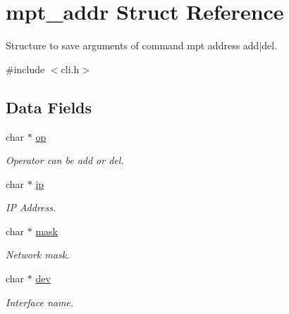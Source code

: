 \hypertarget{structmpt__addr}{\section{mpt\-\_\-addr Struct Reference}
\label{structmpt__addr}
}


Structure to save arguments of command mpt address add$|$del.  




{\ttfamily \#include $<$cli.\-h$>$}

\subsection*{Data Fields}
\begin{DoxyCompactItemize}
\item 
\hypertarget{structmpt__addr_a15206368e0a18f984f0ad6cb10c2995e}{char $\ast$ \hyperlink{structmpt__addr_a15206368e0a18f984f0ad6cb10c2995e}{op}}\label{structmpt__addr_a15206368e0a18f984f0ad6cb10c2995e}

\begin{DoxyCompactList}\small\item\em Operator can be add or del. \end{DoxyCompactList}\item 
\hypertarget{structmpt__addr_afbc356cd0e25d1dbbece7c10fd025fa6}{char $\ast$ \hyperlink{structmpt__addr_afbc356cd0e25d1dbbece7c10fd025fa6}{ip}}\label{structmpt__addr_afbc356cd0e25d1dbbece7c10fd025fa6}

\begin{DoxyCompactList}\small\item\em I\-P Address. \end{DoxyCompactList}\item 
\hypertarget{structmpt__addr_acd90c48c0e60103e7db2ebddc2753d12}{char $\ast$ \hyperlink{structmpt__addr_acd90c48c0e60103e7db2ebddc2753d12}{mask}}\label{structmpt__addr_acd90c48c0e60103e7db2ebddc2753d12}

\begin{DoxyCompactList}\small\item\em Network mask. \end{DoxyCompactList}\item 
\hypertarget{structmpt__addr_abe78755474c1323a5ac7b3dd6d03dedf}{char $\ast$ \hyperlink{structmpt__addr_abe78755474c1323a5ac7b3dd6d03dedf}{dev}}\label{structmpt__addr_abe78755474c1323a5ac7b3dd6d03dedf}

\begin{DoxyCompactList}\small\item\em Interface name. \end{DoxyCompactList}\end{DoxyCompactItemize}


